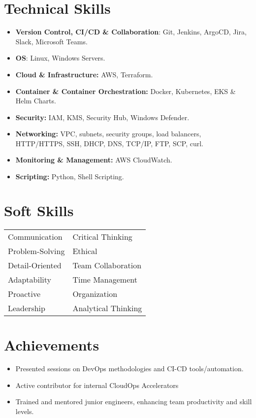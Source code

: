\documentclass[a4paper,10pt]{article}
\newcommand{\resumeItem}[1]{
  \item\small{
    {#1 \vspace{-2pt}}
  }
}
\newcommand{\resumeSubHeadingListStart}{\begin{itemize}[leftmargin=0.15in, label={}]}
\newcommand{\resumeSubHeadingListEnd}{\end{itemize}}
\begin{document}
\section{Technical Skills}
\begin{itemize}[leftmargin=0.15in, label={}]
  \item \textbf{Version Control, CI/CD \& Collaboration}: Git, Jenkins, ArgoCD, Jira, Slack, Microsoft Teams.
  \item \textbf{OS}: Linux, Windows Servers.
  \item \textbf{Cloud \& Infrastructure:} AWS, Terraform.
  \item \textbf{Container \& Container Orchestration:} Docker, Kubernetes, EKS \& Helm Charts.
  \item \textbf{Security:} IAM, KMS, Security Hub, Windows Defender.
  \item \textbf{Networking:} VPC, subnets, security groups, load balancers, HTTP/HTTPS, SSH, DHCP, DNS, TCP/IP, FTP, SCP, curl.
  \item \textbf{Monitoring \& Management:} AWS CloudWatch.
  \item \textbf{Scripting:} Python, Shell Scripting.
\end{itemize}

\section*{Soft Skills}
\begin{tabular}{p{} p{}}
    Communication & Critical Thinking \\
    Problem-Solving & Ethical \\
    Detail-Oriented & Team Collaboration \\
    Adaptability & Time Management \\
    Proactive & Organization \\
    Leadership & Analytical Thinking \\
    
\end{tabular}




\section{Achievements}
\resumeSubHeadingListStart
  \resumeItem{Presented sessions on DevOps methodologies and CI-CD tools/automation.}
  \resumeItem{Active contributor for internal CloudOps Accelerators }
  \resumeItem{Trained and mentored junior engineers, enhancing team productivity and skill levels.}
  \resumeSubHeadingListEnd
\end{document}
